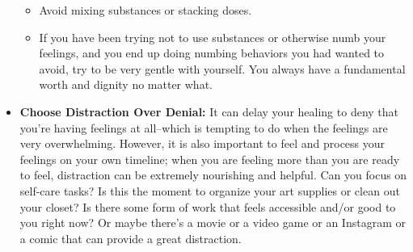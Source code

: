 \documentclass[12pt,letterpaper]{book}
\begin{document}
\begin{itemize}
\begin{itemize}
        \item Avoid mixing substances or stacking doses.
        \item If you have been trying not to use substances or otherwise numb your feelings, and you end up doing numbing behaviors you had wanted to avoid, try to be very gentle with yourself. You always have a fundamental worth and dignity no matter what.
    \end{itemize}
    \item \textbf{Choose Distraction Over Denial:} It can delay your healing to deny that you're having feelings at all–which is tempting to do when the feelings are very overwhelming. However, it is also important to feel and process your feelings on your own timeline; when you are feeling more than you are ready to feel, distraction can be extremely nourishing and helpful. Can you focus on self-care tasks? Is this the moment to organize your art supplies or clean out your closet? Is there some form of work that feels accessible and/or good to you right now? Or maybe there's a movie or a video game or an Instagram or a comic that can provide a great distraction.
\end{itemize}
\end{document}
